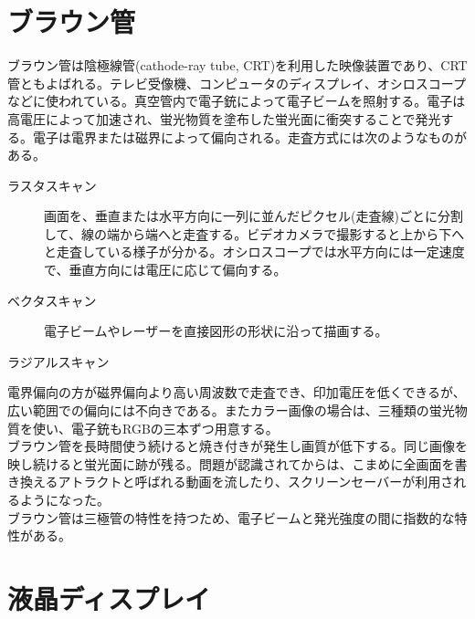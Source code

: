 	\section{ブラウン管}
		ブラウン管は陰極線管(cathode-ray tube, CRT)を利用した映像装置であり、CRT管ともよばれる。テレビ受像機、コンピュータのディスプレイ、オシロスコープなどに使われている。真空管内で電子銃によって電子ビームを照射する。電子は高電圧によって加速され、蛍光物質を塗布した蛍光面に衝突することで発光する。電子は電界または磁界によって偏向される。走査方式には次のようなものがある。
		\begin{description}
			\item[ラスタスキャン] 画面を、垂直または水平方向に一列に並んだピクセル(走査線)ごとに分割して、線の端から端へと走査する。ビデオカメラで撮影すると上から下へと走査している様子が分かる。オシロスコープでは水平方向には一定速度で、垂直方向には電圧に応じて偏向する。
			\item[ベクタスキャン] 電子ビームやレーザーを直接図形の形状に沿って描画する。
			\item[ラジアルスキャン]
		\end{description}
		電界偏向の方が磁界偏向より高い周波数で走査でき、印加電圧を低くできるが、広い範囲での偏向には不向きである。またカラー画像の場合は、三種類の蛍光物質を使い、電子銃もRGBの三本ずつ用意する。\\
		ブラウン管を長時間使う続けると焼き付きが発生し画質が低下する。同じ画像を映し続けると蛍光面に跡が残る。問題が認識されてからは、こまめに全画面を書き換えるアトラクトと呼ばれる動画を流したり、スクリーンセーバーが利用されるようになった。\\
		ブラウン管は三極管の特性を持つため、電子ビームと発光強度の間に指数的な特性がある。
	\section{液晶ディスプレイ}